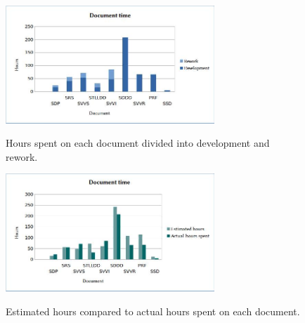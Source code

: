 \documentclass[a4paper]{article}
\begin{document}
\begin{figure}[h!]
\centering
\includegraphics[width=0.7\textwidth]{dev-re.jpg}
\label{fig:dev-re}
\caption{Hours spent on each document divided into development and rework.}
\end{figure}

\begin{figure}[h!]
\centering
\includegraphics[width=0.7\textwidth]{doc.jpg}
\label{fig:doc}
\caption{Estimated hours compared to actual hours spent on each document.}
\end{figure}

\FloatBarrier
\end{document}
